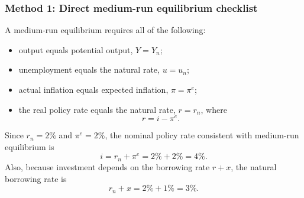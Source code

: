 \documentclass[12pt]{article}
\begin{document}
\subsubsection{Method 1: Direct medium-run equilibrium checklist}
A medium-run equilibrium requires all of the following:
\begin{itemize}[leftmargin=*]
    \item output equals potential output, \(Y=Y_n\);
    \item unemployment equals the natural rate, \(u=u_n\);
    \item actual inflation equals expected inflation, \(\pi=\pi^e\);
    \item the real policy rate equals the natural rate, \(r=r_n\), where
    \[
    r=i-\pi^e.
    \]
\end{itemize}
Since \(r_n=2\%\) and \(\pi^e=2\%\), the nominal policy rate consistent with medium-run equilibrium is
\[
i=r_n+\pi^e=2\%+2\%=4\%.
\]
Also, because investment depends on the borrowing rate \(r+x\), the natural borrowing rate is
\[
r_n+x=2\%+1\%=3\%.
\]
\end{document}
